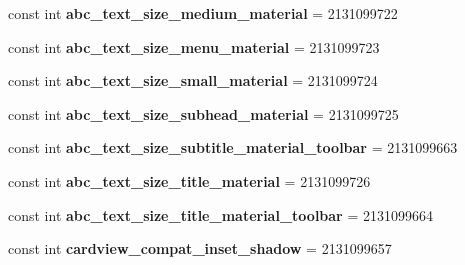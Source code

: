 \begin{DoxyCompactItemize}
const int {\bfseries abc\+\_\+text\+\_\+size\+\_\+medium\+\_\+material} = 2131099722
\item 
\mbox{\label{class_pinned_app_1_1_droid_1_1_resource_1_1_dimension_af8d0a90bc06c2265dde4d6dc8f70c185}} 
const int {\bfseries abc\+\_\+text\+\_\+size\+\_\+menu\+\_\+material} = 2131099723
\item 
\mbox{\label{class_pinned_app_1_1_droid_1_1_resource_1_1_dimension_acd38b30a9635f6efa13ad4bfdee0b63c}} 
const int {\bfseries abc\+\_\+text\+\_\+size\+\_\+small\+\_\+material} = 2131099724
\item 
\mbox{\label{class_pinned_app_1_1_droid_1_1_resource_1_1_dimension_aebf9d0772ed000ae2d3421cd9ef47aee}} 
const int {\bfseries abc\+\_\+text\+\_\+size\+\_\+subhead\+\_\+material} = 2131099725
\item 
\mbox{\label{class_pinned_app_1_1_droid_1_1_resource_1_1_dimension_a73248a0dc375cee187d7db780193ba8a}} 
const int {\bfseries abc\+\_\+text\+\_\+size\+\_\+subtitle\+\_\+material\+\_\+toolbar} = 2131099663
\item 
\mbox{\label{class_pinned_app_1_1_droid_1_1_resource_1_1_dimension_ae9a8f7c65d427231f012073e01ceca20}} 
const int {\bfseries abc\+\_\+text\+\_\+size\+\_\+title\+\_\+material} = 2131099726
\item 
\mbox{\label{class_pinned_app_1_1_droid_1_1_resource_1_1_dimension_a820b4181d902781c783847f10b799c00}} 
const int {\bfseries abc\+\_\+text\+\_\+size\+\_\+title\+\_\+material\+\_\+toolbar} = 2131099664
\item 
\mbox{\label{class_pinned_app_1_1_droid_1_1_resource_1_1_dimension_a2168d55589c253b406ec82202eb08b6e}} 
const int {\bfseries cardview\+\_\+compat\+\_\+inset\+\_\+shadow} = 2131099657
\item 
\mbox{\label{class_pinned_app_1_1_droid_1_1_resource_1_1_dimension_a665d3d1d4df55b21d457a543fc930c0f}} 

\end{DoxyCompactItemize}
